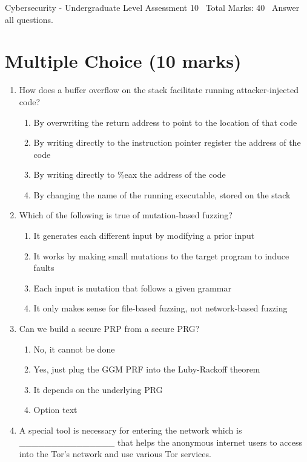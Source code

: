 \documentclass[12pt]{article}
\begin{document}
\begin{center}
Cybersecurity - Undergraduate Level Assessment 10 \
Total Marks: 40 \
Answer all questions.
\end{center}

\section*{Multiple Choice (10 marks)}
\begin{enumerate}[label=\arabic*.]
\item How does a buffer overflow on the stack facilitate running attacker-injected code?
\begin{enumerate}[label=(\alph*)]
    \item By overwriting the return address to point to the location of that code
    \item By writing directly to the instruction pointer register the address of the code
    \item By writing directly to \%eax the address of the code
    \item By changing the name of the running executable, stored on the stack
\end{enumerate}
\item Which of the following is true of mutation-based fuzzing?
\begin{enumerate}[label=(\alph*)]
    \item It generates each different input by modifying a prior input
    \item It works by making small mutations to the target program to induce faults
    \item Each input is mutation that follows a given grammar
    \item It only makes sense for file-based fuzzing, not network-based fuzzing
\end{enumerate}
\item Can we build a secure PRP from a secure PRG?
\begin{enumerate}[label=(\alph*)]
    \item No, it cannot be done
    \item Yes, just plug the GGM PRF into the Luby-Rackoff theorem
    \item It depends on the underlying PRG
    \item Option text
\end{enumerate}
\item A special tool is necessary for entering the network which is \_\_\_\_\_\_\_\_\_\_\_\_\_\_\_ that helps the anonymous internet users to access into the Tor's network and use various Tor services.

\end{enumerate}
\end{document}
